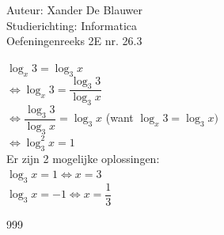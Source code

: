 \documentclass[a4paper]{article}
\begin{document}
\noindent \large Auteur: Xander De Blauwer \\
\noindent \large Studierichting: Informatica\\
\noindent \large Oefeningenreeks 2E nr. 26.3\\

\medskip

\normalsize


$\log_x 3 = \log_3 x$ \\

$\Leftrightarrow \log_x 3 = \dfrac{\log_3 3}{\log_3 x}$ \\

$\Leftrightarrow \dfrac{\log_3 3}{\log_3 x} = \log_3 x$ (want $\log_x 3 = \log_3 x)$\\

$\Leftrightarrow \log_3^2 x = 1$ \\

Er zijn 2 mogelijke oplossingen: \\

$\log_3 x = 1 \Leftrightarrow x = 3 $\\

$\log_3 x = -1 \Leftrightarrow x = \dfrac{1}{3}$ \\






\begin{thebibliography}{999}
\end{thebibliography}
\end{document}

